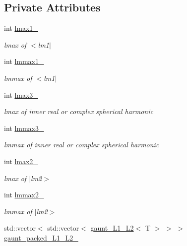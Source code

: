 \subsection*{Private Attributes}
\begin{DoxyCompactItemize}
\item 
int \hyperlink{classsirius_1_1_gaunt__coefficients_a8ddbcceeffa0ce2992080d8a671c023d}{lmax1\+\_\+}
\begin{DoxyCompactList}\small\item\em lmax of $<$lm1$\vert$ \end{DoxyCompactList}\item 
int \hyperlink{classsirius_1_1_gaunt__coefficients_a958c8c57277f3e424c56e2272952fe02}{lmmax1\+\_\+}
\begin{DoxyCompactList}\small\item\em lmmax of $<$lm1$\vert$ \end{DoxyCompactList}\item 
int \hyperlink{classsirius_1_1_gaunt__coefficients_a9491247cb6d44417403af75a42aac68a}{lmax3\+\_\+}
\begin{DoxyCompactList}\small\item\em lmax of inner real or complex spherical harmonic \end{DoxyCompactList}\item 
int \hyperlink{classsirius_1_1_gaunt__coefficients_abc22062f4949905eb01ea1ed6d82eb79}{lmmax3\+\_\+}
\begin{DoxyCompactList}\small\item\em lmmax of inner real or complex spherical harmonic \end{DoxyCompactList}\item 
int \hyperlink{classsirius_1_1_gaunt__coefficients_adac237ddd6c522f74e5f97e1ebcaceb9}{lmax2\+\_\+}
\begin{DoxyCompactList}\small\item\em lmax of $\vert$lm2$>$ \end{DoxyCompactList}\item 
int \hyperlink{classsirius_1_1_gaunt__coefficients_a428fcaf6fa20fb79f487b7abfd648b04}{lmmax2\+\_\+}
\begin{DoxyCompactList}\small\item\em lmmax of $\vert$lm2$>$ \end{DoxyCompactList}\item 
std\+::vector$<$ std\+::vector$<$ \hyperlink{structsirius_1_1gaunt___l1___l2}{gaunt\+\_\+\+L1\+\_\+\+L2}$<$ T $>$ $>$ $>$ \hyperlink{classsirius_1_1_gaunt__coefficients_a8874c91c944a9f77963b0bc6c0d93e0f}{gaunt\+\_\+packed\+\_\+\+L1\+\_\+\+L2\+\_\+}

\end{DoxyCompactItemize}
